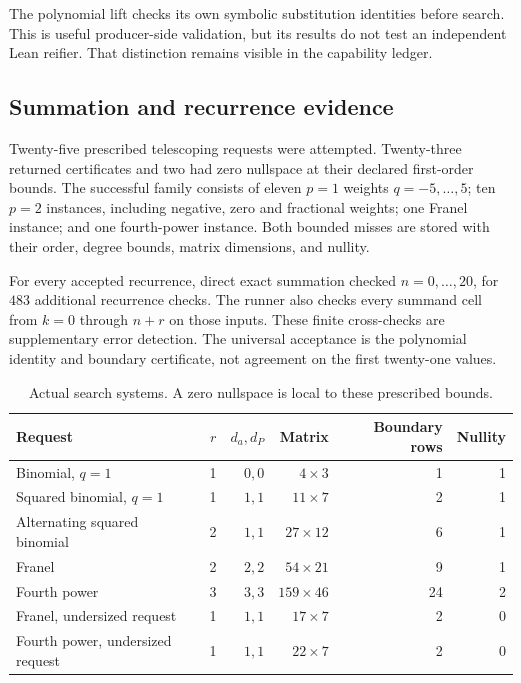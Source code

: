 The polynomial lift checks its own symbolic substitution identities before
search. This is useful producer-side validation, but its results do not test an
independent Lean reifier. That distinction remains visible in the capability
ledger.

\subsection{Summation and recurrence evidence}

Twenty-five prescribed telescoping requests were attempted. Twenty-three
returned certificates and two had zero nullspace at their declared
first-order bounds. The successful family consists of eleven $p=1$ weights
$q=-5,\ldots,5$; ten $p=2$ instances, including negative, zero and fractional
weights; one Franel instance; and one fourth-power instance. Both bounded misses
are stored with their order, degree bounds, matrix dimensions, and nullity.

For every accepted recurrence, direct exact summation checked $n=0,\ldots,20$,
for $483$ additional recurrence checks. The runner also checks every summand
cell from $k=0$ through $n+r$ on those inputs. These finite cross-checks are
supplementary error detection. The universal acceptance is the polynomial
identity and boundary certificate, not agreement on the first twenty-one
values.

\begin{table}[ht]
\centering\small
\begin{tabular}{@{}lrrrrr@{}}
\toprule
Request & $r$ & $d_a,d_P$ & Matrix & Boundary rows & Nullity\\
\midrule
Binomial, $q=1$ & 1 & $0,0$ & $4\times3$ & 1 & 1\\
Squared binomial, $q=1$ & 1 & $1,1$ & $11\times7$ & 2 & 1\\
Alternating squared binomial & 2 & $1,1$ & $27\times12$ & 6 & 1\\
Franel & 2 & $2,2$ & $54\times21$ & 9 & 1\\
Fourth power & 3 & $3,3$ & $159\times46$ & 24 & 2\\
Franel, undersized request & 1 & $1,1$ & $17\times7$ & 2 & 0\\
Fourth power, undersized request & 1 & $1,1$ & $22\times7$ & 2 & 0\\
\bottomrule
\end{tabular}
\caption{Actual search systems. A zero nullspace is local to these prescribed bounds.}
\end{table}

